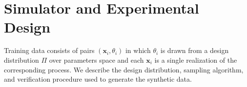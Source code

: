 \documentclass[11pt,letterpaper]{article}
\newcommand{\1}{\mathds{1}}
\newcommand{\pc}{\mathbf{x}}
\theoremstyle{plain}
\theoremstyle{definitioncolon}
\begin{document}
%
\section{Simulator and Experimental Design}
\label{sec:simulator}

Training data consists of pairs $(\pc_i, \theta_i)$ in which $\theta_i$ is drawn
from a design distribution $\Pi$ over parameters space and each $\pc_i$ is a
single realization of the corresponding process. We describe the design
distribution, sampling algorithm, and verification procedure used to generate
the synthetic data.

\end{document}
